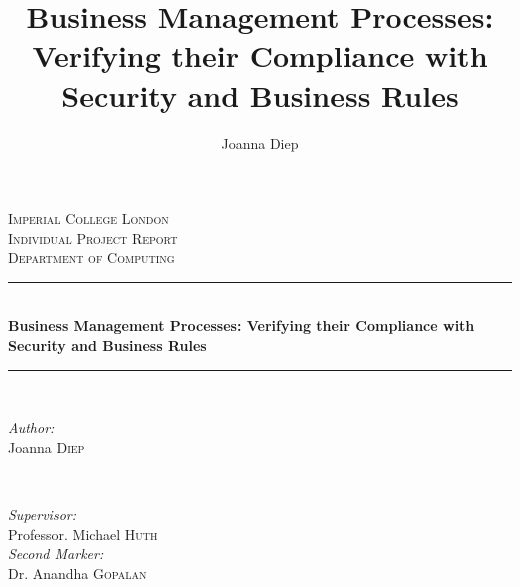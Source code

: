 \documentclass[a4paper]{report}
\title{Business Management Processes: Verifying their Compliance with Security and Business Rules}
\author{Joanna Diep}
\begin{document}

\begin{titlepage}
\newcommand{\HRule}{\rule{\linewidth}{0.5mm}} %

\center %

\textsc{\LARGE Imperial College London}\\[1.5cm] %
\textsc{\Large Individual Project Report}\\[0.5cm] %
\textsc{\large Department of Computing}\\[0.5cm] %

\HRule \\[0.4cm]
{ \huge \bfseries Business Management Processes: Verifying their Compliance with Security and Business Rules}\\[0.4cm] %
\HRule \\[1.5cm]
 
\begin{minipage}{0.4\textwidth}
\begin{flushleft} \large
\emph{Author:}\\
Joanna \textsc{Diep} 
\end{flushleft}
\end{minipage}
~
\begin{minipage}{0.4\textwidth}
\begin{flushright} \large
\emph{Supervisor:} \\
Professor. Michael \textsc{Huth} \\ 
\emph{Second Marker:} \\
Dr. Anandha \textsc{Gopalan} 
\end{flushright}
\end{minipage}\\[4cm]


\end{titlepage}
\end{document}
